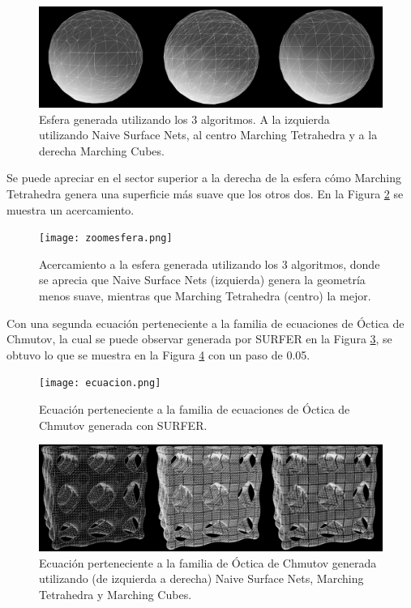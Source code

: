 \documentclass[12pt]{article}
\begin{document}
\begin{figure}[h!]
\includegraphics[width=\linewidth,center]{compec1.png}
\caption{Esfera generada utilizando los 3 algoritmos. A la izquierda utilizando Naive Surface Nets, al centro Marching Tetrahedra y a la derecha Marching Cubes.}
  \label{esf1g}
\end{figure}

Se puede apreciar en el sector superior a la derecha de la esfera cómo Marching Tetrahedra genera una superficie más suave que los otros dos. En la Figura \ref{acercamientoEsf} se muestra un acercamiento.

\begin{figure}[h!]
\texttt{[image: zoomesfera.png]}
\caption{Acercamiento a la esfera generada utilizando los 3 algoritmos, donde se aprecia que Naive Surface Nets (izquierda) genera la geometría menos suave, mientras que Marching Tetrahedra (centro) la mejor.}
\label{acercamientoEsf}
\end{figure}

Con una segunda ecuación perteneciente a la familia de ecuaciones de Óctica de Chmutov, la cual se puede observar generada por SURFER en la Figura \ref{CHSURFER}, se obtuvo lo que se muestra en la Figura \ref{ecuacionG} con un paso de 0.05.

\begin{figure}[h!]
\texttt{[image: ecuacion.png]}
\caption{Ecuación  perteneciente a la familia de ecuaciones de Óctica de Chmutov generada con SURFER.}
\label{CHSURFER}
\end{figure}

\begin{figure}[h!]
\includegraphics[width=\linewidth,center]{compec2.png}
\caption{Ecuación perteneciente a la familia de Óctica de Chmutov generada utilizando (de izquierda a derecha)  Naive Surface Nets, Marching Tetrahedra y  Marching Cubes.}
  \label{ecuacionG}
\end{figure}
\end{document}
